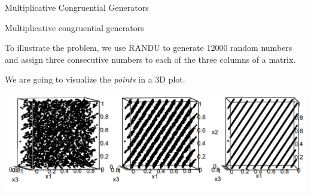 \documentclass[11pt,compress,t,notes=noshow, xcolor=table]{beamer}
\begin{document}
\begin{vbframe}{Multiplicative Congruential Generators}

\end{vbframe}

\begin{vbframe}{Multiplicative congruential generators}

To illustrate the problem, we use RANDU to generate 12000 random numbers and assign three consecutive numbers to each of the three columns of a matrix.


We are going to visualize the
\emph{points} in a 3D plot.






\vspace*{1cm}

\begin{center}
\includegraphics{figure_man/randu.png}
\end{center}



\end{vbframe}
\end{document}
